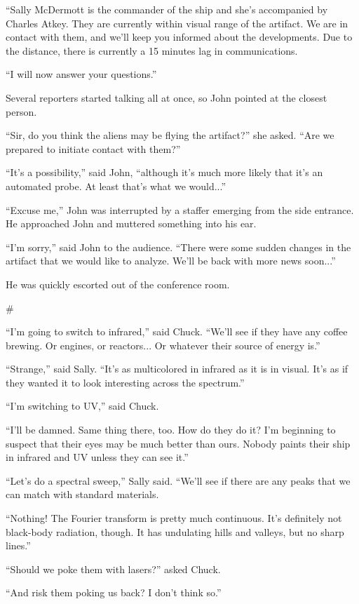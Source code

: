 \documentclass[12pt]{book}
\newcommand{\sbreak}{
\begin{center}
  \#
\end{center}
}
\begin{document}
``Sally McDermott is the commander of the ship and she's accompanied by Charles Atkey. They are currently within visual range of the artifact. We are in contact with them, and we'll keep you informed about the developments. Due to the distance, there is currently a 15 minutes lag in communications.

``I will now answer your questions.''

Several reporters started talking all at once, so John pointed at the closest person.

``Sir, do you think the aliens may be flying the artifact?'' she asked. ``Are we prepared to initiate contact with them?''

``It's a possibility,'' said John, ``although it's much more likely that it's an automated probe. At least that's what we would...''

``Excuse me,'' John was interrupted by a staffer emerging from the side entrance. He approached John and muttered something into his ear.

``I'm sorry,'' said John to the audience. ``There were some sudden changes in the artifact that we would like to analyze. We'll be back with more news soon...''

He was quickly escorted out of the conference room.

\sbreak

``I'm going to switch to infrared,'' said Chuck. ``We'll see if they have any coffee brewing. Or engines, or reactors... Or whatever their source of energy is.''

``Strange,'' said Sally. ``It's as multicolored in infrared as it is in visual. It's as if they wanted it to look interesting across the spectrum.''

``I'm switching to UV,'' said Chuck. 

``I'll be damned. Same thing there, too. How do they do it? I'm beginning to suspect that their eyes may be much better than ours. Nobody paints their ship in infrared and UV unless they can see it.''

``Let's do a spectral sweep,'' Sally said. ``We'll see if there are any peaks that we can match with standard materials.

``Nothing! The Fourier transform is pretty much continuous. It's definitely not black-body radiation, though. It has undulating hills and valleys, but no sharp lines.''

``Should we poke them with lasers?'' asked Chuck.

``And risk them poking us back? I don't think so.''
\end{document}

